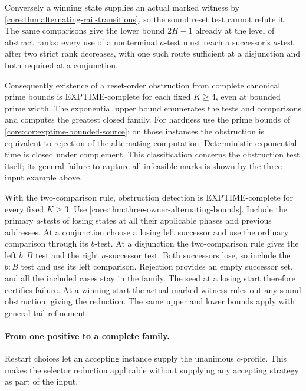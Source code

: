 Conversely a winning state supplies an actual
marked witness by
\cref{core:thm:alternating-rail-transitions}, so the
sound reset test cannot refute it. The same comparisons
give the lower bound $2H-1$ already at the level
of abstract ranks: every use of a nonterminal
$a$-test must reach a successor's $a$-test after
two strict rank decreases, with one such route
sufficient at a disjunction and both required at
a conjunction.

Consequently existence of a reset-order obstruction
from complete canonical prime bounds is
EXPTIME-complete for each fixed $K\ge4$, even at
bounded prime width. The exponential upper bound
enumerates the tests and comparisons and computes
the greatest closed family. For hardness use the
prime bounds of \cref{core:cor:exptime-bounded-source}:
on those instances the obstruction is equivalent
to rejection of the alternating computation.
Deterministic exponential time is closed under
complement. This classification concerns the
obstruction test itself; its general failure to
capture all infeasible marks is shown by the
three-input example above.

With the two-comparison rule, obstruction detection
is EXPTIME-complete for every fixed $K\ge3$.
Use \cref{core:thm:three-owner-alternating-bounds}.
Include the primary $a$-tests of losing states at
all their applicable phases and previous addresses.
At a conjunction choose a losing left successor
and use the ordinary comparison through its $b$-test.
At a disjunction the two-comparison rule gives the
left $b:B$ test and the right $a$-successor test.
Both successors lose, so include the $b:B$ test
and use its left comparison. Rejection provides
an empty successor set, and all the included cases
stay in the family. The seed at a losing start
therefore certifies failure. At a winning start
the actual marked witness rules out any sound
obstruction, giving the reduction. The same upper
and lower bounds apply with general tail refinement.

\paragraph{From one positive to a complete family.}
Restart choices let an accepting instance supply the unanimous
$c$-profile. This makes the selector reduction applicable without
supplying any accepting strategy as part of the input.

